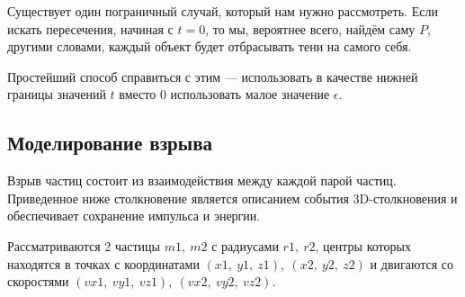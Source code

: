 Существует один пограничный случай, который нам нужно рассмотреть. Если искать пересечения, начиная с $t=0$, то мы, вероятнее всего, найдём саму $P$, другими словами, каждый объект будет отбрасывать тени на самого себя. 

Простейший способ справиться с этим — использовать в качестве нижней границы значений $t$ вместо 0 использовать малое значение $\epsilon$. 

\subsection{\textbf{Моделирование взрыва}}

\hfill

Взрыв частиц состоит из взаимодействия между каждой парой частиц. Приведенное ниже столкновение является описанием события 3D-столкновения и обеспечивает сохранение импульса и энергии.

Рассматриваются 2 частицы $m1,~ m2$ с радиусами $r1,~r2$, центры которых находятся в точках с координатами $(x1,~y1,~z1),~(x2,~y2,~z2)$ и двигаются со скоростями $(vx1,~vy1,~vz1),~(vx2,~vy2,~vz2)$. 

